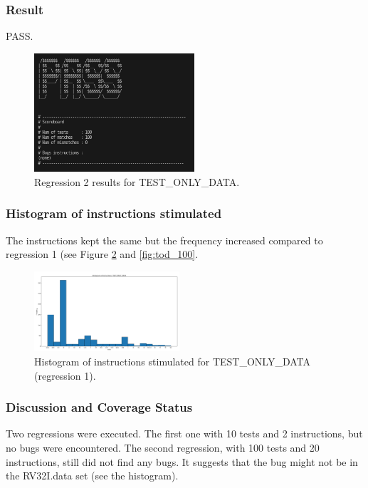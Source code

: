 \subsubsection{Result}
PASS.

\begin{figure}[H]
    \centering
    \includegraphics[width=0.53\textwidth]{./c3l1_img/tod_100_r.png}
    \caption{Regression 2 results for TEST\_ONLY\_DATA.}
    \label{fig:tod_100_r}
\end{figure}

\subsubsection{Histogram of instructions stimulated}

The instructions kept the same but the frequency increased compared to regression 1 (see Figure \ref{fig:tod_10}
 and \ref{fig:tod_100}.
 
\begin{figure}[ht]
    \centering
    \includegraphics[width=0.48\textwidth]{./c3l1_img/tod_10.png}
    \caption{Histogram of instructions stimulated for TEST\_ONLY\_DATA (regression 1).}
    \label{fig:tod_10}
\end{figure}


\subsubsection{Discussion and Coverage Status}

Two regressions were executed. The first one with 10 tests and 2 instructions, but no bugs were encountered. The second regression, with 100 tests and 20 instructions, still did not find any bugs. It suggests that the bug might not be in the RV32I.data set (see the histogram).

